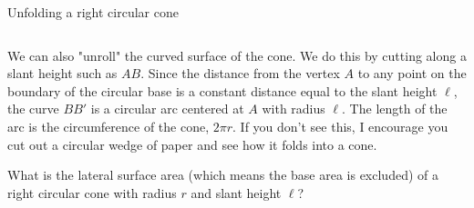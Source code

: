 \documentclass[9pt,aspectratio=169]{beamer}
\begin{document}
\begin{frame}{Unfolding a right circular cone}
  \begin{columns}[T]
    \begin{column}{0.5\textwidth}
      We can also "unroll" the curved surface of the cone.  We do this by cutting along a slant height such as $AB$.  Since the distance from the vertex $A$ to any point on the boundary of the circular base is a constant distance equal to the slant height $\ell$, the curve $BB'$ is a circular arc centered at $A$ with radius $\ell$.  The length of the arc is the circumference of the cone, $2\pi r$.  If you don't see this, I encourage you cut out a circular wedge of paper and see how it folds into a cone.
      \small

      \begin{problem}
        What is the lateral surface area (which means the base area is excluded) of a right circular cone with radius $r$ and slant height $\ell$?
      \end{problem}
      

\end{column}
\end{columns}
\end{frame}
\end{document}
